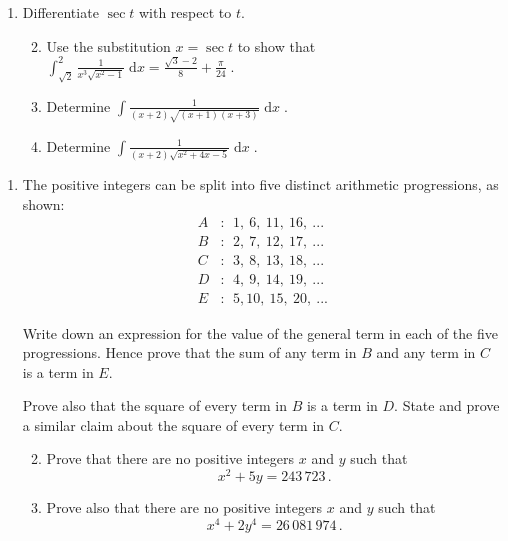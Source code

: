 \documentclass[a4, 11pt]{report}
\newlength{\qspace}
\newcounter{qnumber}
\newenvironment{question}%
 {\vspace{\qspace}
  \begin{enumerate}[\bfseries 1\quad][10]%
    \setcounter{enumi}{\value{qnumber}}%
    \item%
 }
{
  \end{enumerate}
  \filbreak
  \stepcounter{qnumber}
 }
\newenvironment{questionparts}[1][1]%
 {
  \begin{enumerate}[\bfseries (i)]%
    \setcounter{enumii}{#1}
    \addtocounter{enumii}{-1}
    \setlength{\itemsep}{5mm}
    \setlength{\parskip}{8pt}
 }
 {
  \end{enumerate}
 }
\begin{document}
\begin{question}
 Differentiate $\sec {t}$ with respect to $t$.

\begin{questionparts}
\item Use the substitution $x=\sec t$ to show that
$\displaystyle \int^2_{\sqrt 2} \frac{1}{ x^3\sqrt {x^2-1} } \; \mathrm{d}x
=\frac{\sqrt 3 - 2}{8} + \frac {\pi}{24} \;.$
\item Determine 
$\displaystyle \int \frac{1}  {( x+2)  \sqrt {(x+1)(x+3)} } \; 
\mathrm{d}x \;$.
\item Determine 
$\displaystyle \int \frac {1} {(x+2)  \sqrt {x^2+4x-5} } \; 
\mathrm{d}x \;$.

\end{questionparts}
\end{question}

\begin{question}
The positive integers can be split into 
five distinct arithmetic progressions, as shown:
\begin{align*}
A&: \ \ 1, \ 6, \ 11, \ 16, \ ... \\
B&: \ \ 2, \ 7, \ 12, \ 17, \ ...\\
C&: \ \ 3, \ 8, \ 13, \ 18, \ ... \\
D&: \ \ 4, \ 9, \ 14, \ 19, \ ...  \\
E&: \ \ 5,  10, \ 15, \ 20, \ ...
\end{align*}

Write down an expression for the value of the general term 
in each of the five progressions. 
Hence prove that the sum of any term in $B$ 
and any term in $C$ is a term in $E$. 


Prove also that the square of every term in $B$ is a term in $D$. 
State and prove a similar claim about the square of every term in $C$.

\begin{questionparts}
\item Prove that there are no positive integers $x$ and $y$ such that
\[
x^2+5y=243\,723 \,.
\]

\item Prove also that there are no positive integers 
$x$ and $y$ such that
\[
x^4+2y^4=26\,081\,974 \,.
\]
\end{questionparts}
	\end{question}
	
\end{document}
